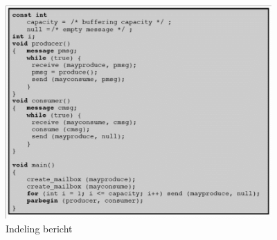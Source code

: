 \begin{figure}[htp]
    \centering
            \includegraphics[width=4in]{img/producerconsumer.png}
        \caption{Indeling bericht}
    \label{fig:Indeling bericht}
\end{figure}